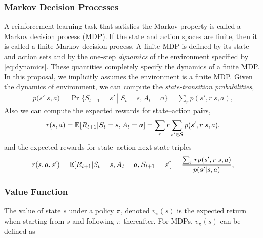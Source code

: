 \documentclass[letterpaper,titlepage]{article}
\begin{document}
\subsubsection*{Markov Decision Processes}
A reinforcement learning task that satisfies the Markov property is called a Markov decision process (MDP). If the state and action spaces are finite, then it is called a finite Markov decision process. A finite MDP is defined by its state and action sets and by the one-step \emph{dynamics} of the environment specified by \eqref{eq:dynamics}. These quantities completely specify the dynamics of a finite MDP. In this proposal, we implicitly assumes the environment is a finite MDP. Given the dynamics of environment, we can compute the \emph{state-transition probabilities},
\begin{align}
p(s' | s, a) = \Pr \{ S_{t+1} = s' ~ | ~ S_t = s, A_t = a \} = \sum_{r} p(s', r | s, a),
\label{eq:state-transition-probabilities}
\end{align}
Also we can compute the expected rewards for state–action pairs,
\begin{align}
r(s,a) = \mathbb{E}[ R_{t+1} | S_t = s, A_t = a ] = \sum_{r} r \sum_{s' \in \mathcal{S}} p(s', r | s, a),
\label{eq:expected-reward}
\end{align}
and the expected rewards for state–action-next state triples
\begin{align}
r(s,a,s') = \mathbb{E}[ R_{t+1} | S_t = s, A_t = a , S_{t+1} = s' ] = \frac{\sum_{r} r  p(s', r | s, a)}{p(s' | s, a)},
\end{align}

\subsubsection*{Value Function}
The value of state $s$ under a policy $\pi$, denoted $v_{\pi}(s)$ is the expected return when starting from $s$ and following $\pi$ thereafter. For MDPs, $v_{\pi}(s)$ can be defined as
\end{document}
